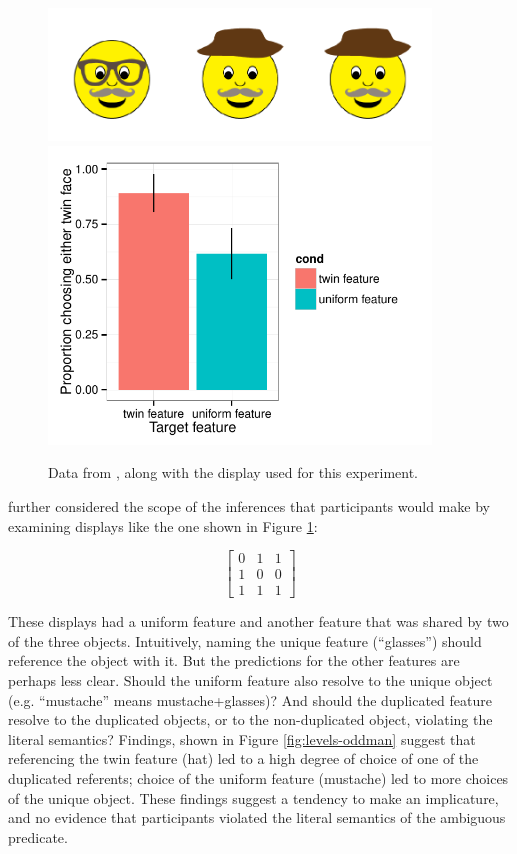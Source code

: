  \begin{figure}[t]
  \centering
  \includegraphics[width=4in]{figures/levels-twins-stim.pdf}
  \includegraphics[width=4in]{../plots/3-levels-twins.pdf}
  \caption{\label{fig:levels-twins} Data from , along with the display used for this experiment.}
\end{figure}

 further considered the scope of the inferences that participants would make by examining displays like the one shown in Figure \ref{fig:levels-twins}:


\begin{equation}
\left[
    \begin{array}{ccc}
      0 & 1 & 1 \\
      1 & 0 & 0\\
      1 & 1 & 1 
    \end{array} 
  \right]
\end{equation}

\noindent These displays had a uniform feature and another feature that was shared by two of the three objects. Intuitively, naming the unique feature (``glasses'') should reference the object with it. But the predictions for the other features are perhaps less clear. Should the uniform feature also resolve to the unique object (e.g. ``mustache'' means {\sc mustache+glasses})? And should the duplicated feature resolve to the duplicated objects, or to the non-duplicated object, violating the literal semantics? Findings, shown in Figure \ref{fig:levels-oddman} suggest that referencing the twin feature ({\sc hat}) led to a high degree of choice of one of the duplicated referents; choice of the uniform feature ({\sc mustache}) led to more choices of the unique object. These findings suggest a tendency to make an implicature, and no evidence that participants violated the literal semantics of the ambiguous predicate. 

